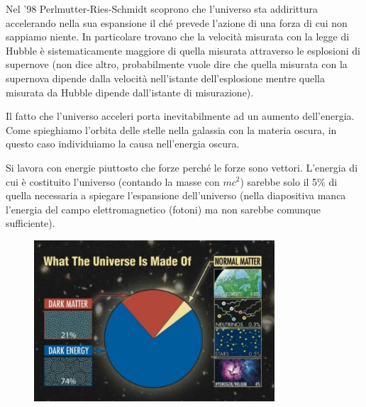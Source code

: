 Nel '98 Perlmutter-Ries-Schmidt scoprono che l'universo sta addirittura accelerando nella sua espansione il ché prevede l'azione di una forza di cui non sappiamo niente. In particolare trovano che la velocità misurata con la legge di Hubble è sistematicamente maggiore di quella misurata attraverso le esplosioni di supernove (non dice altro, probabilmente vuole dire che quella misurata con la supernova dipende dalla velocità nell'istante dell'esplosione mentre quella misurata da Hubble dipende dall'istante di misurazione).

Il fatto che l'universo acceleri porta inevitabilmente ad un aumento dell'energia. Come spieghiamo l'orbita delle stelle nella galassia con la materia oscura, in questo caso individuiamo la causa nell'energia oscura.

Si lavora con energie piuttosto che forze perché le forze sono vettori. L'energia di cui è costituito l'universo (contando la masse con $mc^2$) sarebbe solo il 5\% di quella necessaria a spiegare l'espansione dell'universo (nella diapositiva manca l'energia del campo elettromagnetico (fotoni) ma non sarebbe comunque sufficiente).

\begin{figure}[H]
    \centering
    \includegraphics[width=0.8\textwidth]{immagini16dic/tortauniverso.png}
\end{figure}